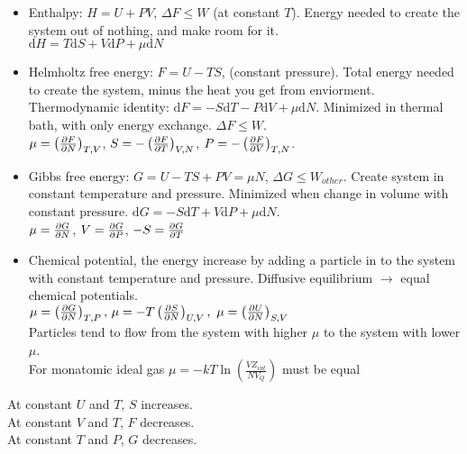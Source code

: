 \documentclass[a4paper, norsk, 8pt]{article}
\begin{document}
\begin{multicols*}{3}
\begin{itemize}
    \item Enthalpy: $H=U+PV$,  $\Delta F \leq W$ (at constant $T$). Energy needed to create the system out of nothing, and make room for it. \\$\mbox{d}H = T\mbox{d}S + V\mbox{d}P +\mu \mbox{d}N$

    \item Helmholtz free energy: $F=U-TS$, (constant pressure). Total energy needed to create the system, minus the heat you get from enviorment. Thermodynamic identity: $\mbox{d}F=-S\mbox{d}T-P\mbox{d}V+\mu\mbox{d}N$. Minimized in thermal bath, with only energy exchange. $\Delta F \leq W$. \\ $\mu=\left( \pdv{F}{N} \right)_{T,V}$, $S=-\left( \pdv{F}{T} \right)_{V, N}$, $P=-\left(\pdv{F}{V}\right)_{T,N}$.

    \item  Gibbs free energy: $G=U-TS+PV = \mu N$, $\Delta G \leq W_{other}$. Create system in constant temperature and pressure. Minimized when change in volume with constant pressure. $\mbox{d}G = -S\mbox{d}T + V\mbox{d}P +\mu \mbox{d}N$. \\ $\mu=\pdv{G}{N}$, $V = \pdv{G}{P}$, $-S=\pdv{G}{T}$
    \item Chemical potential, the energy increase by adding a particle in to the system with constant temperature and pressure. Diffusive equilibrium $\rightarrow$ equal chemical potentials.\\
    $\mu=\left(\pdv{G}{N}\right)_{T,P}, \, \mu=-T\left( \pdv{S}{N} \right)_{U,V}, \,\, \mu=\left( \pdv{U}{N} \right)_{S,V}$\\
    Particles tend to flow from the system with higher $\mu$ to the system with lower $\mu$.\\
    For monatomic ideal gas $\mu = -kT \ln{\left( \frac{VZ_{int}}{NV_Q} \right)}$ must be equal
\end{itemize}
At constant $U$ and $T$, $S$ increases.\\
At constant $V$ and $T$, $F$ decreases.\\
At constant $T$ and $P$, $G$ decreases.\\


\end{multicols*}
\end{document}
